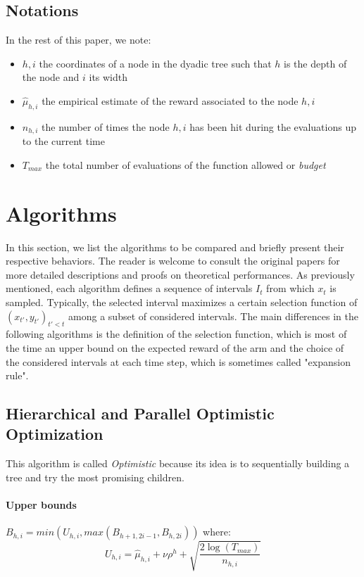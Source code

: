 \documentclass[a4paper,10pt]{article}
\begin{document}
\subsection{Notations}
In the rest of this paper, we note:
\begin{itemize}
\item $h,i$ the coordinates of a node in the dyadic tree such that $h$ is the depth of the node and $i$ its width
\item $\widehat{\mu}_{h,i}$ the empirical estimate of the reward associated to the node $h,i$
\item $n_{h,i}$ the number of times the node $h,i$ has been hit during the evaluations up to the current time
\item $T_{max}$ the total number of evaluations of the function allowed or \textit{budget}
\end{itemize} 



\section{Algorithms}
\label{algo}
In this section, we list the algorithms to be compared and briefly present their respective behaviors. The reader is welcome to consult the original papers for more detailed descriptions and proofs on theoretical performances. As previously mentioned, each algorithm defines a sequence of intervals $I_t$ from which $x_t$ is sampled. Typically, the selected interval maximizes a certain selection function of $(x_{t'},y_{t'})_{t'< t}$ among a subset of considered intervals. The main differences in the following algorithms is the definition of the selection function, which is most of the time an upper bound on the expected reward of the arm and the choice of the considered intervals at each time step, which is sometimes called "expansion rule".

\subsection{Hierarchical and Parallel Optimistic Optimization}
This algorithm is called \textit{Optimistic} because its idea is to sequentially building a tree and try the most promising children.
\paragraph{Upper bounds} $B_{h,i}=min(U_{h,i},max(B_{h+1,2i-1},B_{h,2i}))$ where:
\begin{equation}
\label{uhoo}
U_{h,i}=\widehat{\mu}_{h,i}+\nu \rho^h+\sqrt{\dfrac{2\log(T_{max})}{n_{h,i}}}
\end{equation}
\end{document}

